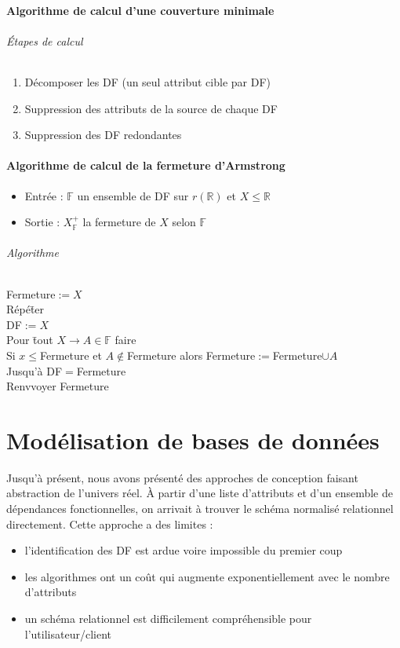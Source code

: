 \documentclass[10pt]{article}
\begin{document}
		\subsection{Algorithme de calcul d'une couverture minimale}
			\paragraph{Étapes de calcul}
				\begin{enumerate}
					\item Décomposer les DF (un seul attribut cible par DF)
					\item Suppression des attributs de la source de chaque DF
					\item Suppression des DF redondantes
				\end{enumerate}
				
		\subsection{Algorithme de calcul de la fermeture d'Armstrong}
			\begin{itemize}
				\item Entrée : $\mathbb{F}$ un ensemble de DF sur $r(\mathbb{R})$ et $X\leq\mathbb{R}$
				\item Sortie : $X^+_\mathbb{F}$ la fermeture de $X$ selon $\mathbb{F}$
			\end{itemize}
			
			\paragraph{Algorithme}
			\begin{tabbing}
				Fermeture$:=X$\\
				Répé\=ter\\
				\>DF$:=X$\\
				\>Pour \= tout $X\rightarrow A\in\mathbb{F}$ faire\\
				\>\>Si $x\leq$Fermeture et $A\notin$Fermeture alors Fermeture$:=$Fermeture$\cup A$\\
				Jusqu'à DF$=$Fermeture\\
				Renvvoyer Fermeture
			\end{tabbing}
			
\newpage
\part{Modélisation de bases de données}
	Jusqu'à présent, nous avons présenté des approches de conception faisant abstraction de l'univers réel. À partir d'une liste d'attributs et d'un ensemble de dépendances fonctionnelles, on arrivait à trouver le schéma normalisé relationnel directement. Cette approche a des limites :
	\begin{itemize}
		\item l'identification des DF est ardue voire impossible du premier coup
		\item les algorithmes ont un coût qui augmente exponentiellement avec le nombre d'attributs
		\item un schéma relationnel est difficilement compréhensible pour l'utilisateur/client
	\end{itemize}
	
\end{document}
